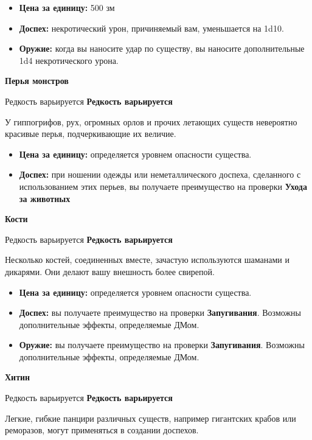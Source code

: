 \documentclass[a4paper, 9pt, twocolumn]{book}
\newcommand{\partc}[2][]{{
		\bigskip
		\noindent
		\hspace{-0.25cm}
		\fontsize{11pt}{13.2}
		\color{sectioncolor}
		\textbf{#2}}
	
	{
		\ifx\relax#1\relax
		\else
		\noindent
		\normalcolor
		\textbf{#1}}
	\bigskip
	\fi
}
\begin{document}
	\begin{itemize}
		\item \textbf{Цена за единицу:} 500 зм
		
		\item \textbf{Доспех:} некротический урон, причиняемый вам, уменьшается на 1d10.
		
		\item \textbf{Оружие:} когда вы наносите удар по существу, вы наносите дополнительные 1d4 некротического урона.
	\end{itemize}
	
	\partc[Редкость варьируется]{Перья монстров}
	
	\noindent У гиппогрифов, рух, огромных орлов и прочих летающих существ невероятно красивые перья, подчеркивающие их величие.
	
	\begin{itemize}
		\item \textbf{Цена за единицу:} определяется уровнем опасности существа.
		
		\item \textbf{Доспех:} при ношении одежды или неметаллического доспеха, сделанного с использованием этих перьев, вы получаете преимущество на проверки \textbf{Ухода за  животных}
	\end{itemize}

	\partc[Редкость варьируется]{Кости}
	
	\noindent Несколько костей, соединенных вместе, зачастую используются шаманами и дикарями. Они делают вашу внешность более свирепой.
	
	\begin{itemize}
		\item \textbf{Цена за единицу:} определяется уровнем опасности существа.
		
		\item \textbf{Доспех:} вы получаете преимущество на проверки \textbf{Запугивания}. Возможны дополнительные эффекты, определяемые ДМом.
		
		\item \textbf{Оружие:} вы получаете преимущество на проверки \textbf{Запугивания}. Возможны дополнительные эффекты, определяемые ДМом.
	\end{itemize}
	
	\partc[Редкость варьируется]{Хитин}
	
	\noindent Легкие, гибкие панцири различных существ, например гигантских крабов или реморазов, могут применяться в создании доспехов.
	
\end{document}
